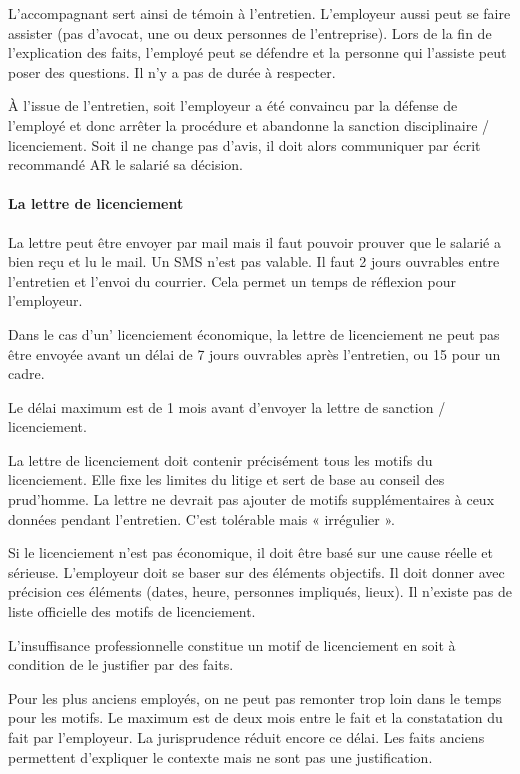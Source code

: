 L’accompagnant sert ainsi de témoin à l’entretien.
L’employeur aussi peut se faire assister (pas d’avocat, une ou deux personnes de l'entreprise).
Lors de la fin de l’explication des faits, l’employé peut se défendre et la personne qui l'assiste peut poser des questions.
Il n'y a pas de durée à respecter.

À l’issue de l’entretien, soit l’employeur a été convaincu par la défense de l’employé et donc arrêter la procédure et abandonne la sanction disciplinaire / licenciement.
Soit il ne change pas d’avis, il doit alors communiquer par écrit recommandé AR le salarié sa décision.


\paragraph{La lettre de licenciement}

La lettre peut être envoyer par mail mais il faut pouvoir prouver que le salarié a bien reçu et lu le mail.
Un SMS n'est pas valable.
Il faut 2 jours ouvrables entre l’entretien et l’envoi du courrier.
Cela permet un temps de réflexion pour l’employeur.

Dans le cas d'un' licenciement économique, la lettre de licenciement ne peut pas être envoyée avant un délai de 7 jours ouvrables après l’entretien, ou 15 pour un cadre.

Le délai maximum est de 1 mois avant d’envoyer la lettre de sanction / licenciement.

La lettre de licenciement doit contenir précisément tous les motifs du licenciement.
Elle fixe les limites du litige et sert de base au conseil des prud’homme.
La lettre ne devrait pas ajouter de motifs supplémentaires à ceux données pendant l’entretien.
C’est tolérable mais « irrégulier ».

Si le licenciement n’est pas économique, il doit être basé sur une cause réelle et sérieuse.
L’employeur doit se baser sur des éléments objectifs.
Il doit donner avec précision ces éléments (dates, heure, personnes impliqués, lieux).
Il n’existe pas de liste officielle des motifs de licenciement.

L’insuffisance professionnelle constitue un motif de licenciement en soit à condition de le justifier par des faits.

Pour les plus anciens employés, on ne peut pas remonter trop loin dans le temps pour les motifs.
Le maximum est de deux mois entre le fait et la constatation du fait par l’employeur.
La jurisprudence réduit encore ce délai.
Les faits anciens permettent d'expliquer le contexte mais ne sont pas une justification.


